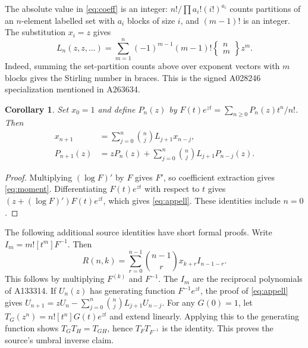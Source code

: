 \documentclass[11pt]{article}
\newtheorem{corollary}[theorem]{Corollary}
\begin{document}
The absolute value in \eqref{eq:coeff} is an integer: $n!/
\prod a_i!(i!)^{a_i}$ counts partitions of an $n$-element labelled set
with $a_i$ blocks of size $i$, and $(m-1)!$ is an integer.
The substitution $x_i=z$ gives
\begin{equation}\label{eq:stirling}
 L_n(z,z,\ldots)=\sum_{m=1}^n(-1)^{m-1}(m-1)!
 \left\{\begin{matrix}n\\m\end{matrix}\right\}z^m.
\end{equation}
Indeed, summing the set-partition counts above over exponent vectors
with $m$ blocks gives the Stirling number in braces. This is the
signed A028246 specialization mentioned in A263634.

\begin{corollary}\label{cor:appell}
Set $x_0=1$ and define $P_n(z)$ by
$F(t)e^{zt}=\sum_{n\geq0}P_n(z)t^n/n!$. Then
\begin{align}
 x_{n+1}&=\sum_{j=0}^n\binom nj L_{j+1}x_{n-j},\label{eq:moment}\\
 P_{n+1}(z)&=zP_n(z)+\sum_{j=0}^n\binom nj L_{j+1}P_{n-j}(z).
 \label{eq:appell}
\end{align}
\end{corollary}
\begin{proof}
Multiplying $(\log F)'$ by $F$ gives $F'$, so coefficient extraction
gives \eqref{eq:moment}. Differentiating $F(t)e^{zt}$ with respect
to $t$ gives $(z+(\log F)')F(t)e^{zt}$, which gives
\eqref{eq:appell}. These identities include $n=0$.
\end{proof}
The following additional source identities have short formal proofs.
Write $I_m=m![t^m]F^{-1}$. Then
\begin{equation}\label{eq:inverse}
 R(n,k)=\sum_{r=0}^{n-1}\binom{n-1}{r}x_{k+r}I_{n-1-r}.
\end{equation}
This follows by multiplying $F^{(k)}$ and $F^{-1}$. The $I_m$ are
the reciprocal polynomials of A133314. If $U_n(z)$ has generating
function $F^{-1}e^{zt}$, the proof of \eqref{eq:appell} gives
$U_{n+1}=zU_n-\sum_{j=0}^n\binom nj L_{j+1}U_{n-j}$.
For any $G(0)=1$, let $T_G(z^n)=n![t^n]G(t)e^{zt}$ and extend
linearly. Applying this to the generating function shows
$T_GT_H=T_{GH}$, hence $T_FT_{F^{-1}}$ is the identity. This proves
the source's umbral inverse claim.
\end{document}
